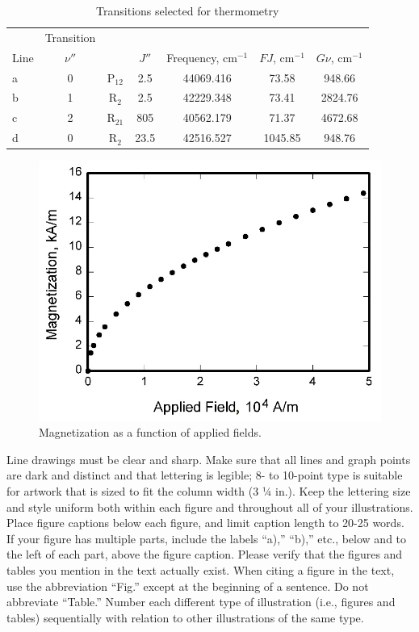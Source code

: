 \documentclass[journal]{new-aiaa}
\begin{document}
\begin{table}[hbt!]
\caption{\label{tab:table1} Transitions selected for thermometry}
\centering
\begin{tabular}{lcccccc}
\hline
& Transition& & \multicolumn{2}{c}{}\\\cline{2-2}
Line& $\nu''$& & $J'' $& Frequency, cm$^{-1}$& $FJ$, cm$^{-1}$& $G\nu $, cm$^{-1}$\\\hline
a& 0& P$_{12}$& 2.5& 44069.416& 73.58& 948.66\\
b& 1& R$_{2}$& 2.5& 42229.348& 73.41& 2824.76\\
c& 2& R$_{21}$& 805& 40562.179& 71.37& 4672.68\\
d& 0& R$_{2}$& 23.5& 42516.527& 1045.85& 948.76\\
\hline
\end{tabular}
\end{table}


\begin{figure}[hbt!]
\centering
\includegraphics[width=.5\textwidth]{graph}
\caption{Magnetization as a function of applied fields.}
\end{figure}

Line drawings must be clear and sharp. Make sure that all lines and graph points are dark and distinct and that lettering is legible; 8- to 10-point type is suitable for artwork that is sized to fit the column width (3 ¼ in.). Keep the lettering size and style uniform both within each figure and throughout all of your illustrations. Place figure captions below each figure, and limit caption length to 20-25 words. If your figure has multiple parts, include the labels “a),” “b),” etc., below and to the left of each part, above the figure caption. Please verify that the figures and tables you mention in the text actually exist. When citing a figure in the text, use the abbreviation “Fig.” except at the beginning of a sentence. Do not abbreviate “Table.” Number each different type of illustration (i.e., figures and tables) sequentially with relation to other illustrations of the same type.
\end{document}
